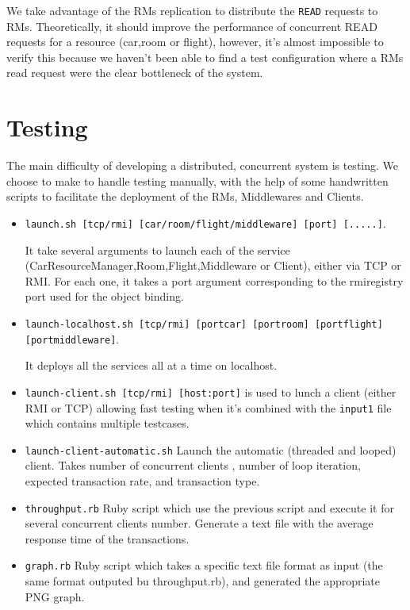 \documentclass[a4paper]{article}
\begin{document}
We take advantage of the RMs replication to distribute the \texttt{READ} requests to RMs. Theoretically, it should improve the performance of concurrent READ requests for a resource (car,room or flight), however, it's almost impossible to verify this because we haven't been able to find a test configuration where a RMs read request were the clear bottleneck of the system.


\section{Testing}

The main difficulty of developing a distributed, concurrent system is testing. We choose to make to handle testing manually, with the help of some handwritten scripts to facilitate the deployment of the RMs, Middlewares and Clients.

\begin{itemize}
\item
{\tt launch.sh [tcp/rmi] [car/room/flight/middleware] [port] [.....]}.

It take several arguments to launch each of the service (CarResourceManager,Room,Flight,Middleware or Client), either via TCP or RMI. For each one, it takes a port argument corresponding to the rmiregistry port used for the object binding.
\item
{\tt launch-localhost.sh [tcp/rmi] [portcar] [portroom] [portflight] [portmiddleware]}.

It deploys all the services all at a time on localhost.

\item
{\tt launch-client.sh [tcp/rmi] [host:port]} is used to lunch a client (either RMI or TCP)
allowing fast testing when it's combined with the {\tt input1} file which contains multiple testcases.

\item
{\tt launch-client-automatic.sh}
Launch the automatic (threaded and looped) client. Takes number of concurrent clients , number of loop iteration, expected transaction rate, and transaction type.

\item
{\tt throughput.rb}
Ruby script which use the previous script and execute it for several concurrent clients number. Generate a text file with the average response time of the transactions.

\item
{\tt graph.rb}
Ruby script which takes a specific text file format as input (the same format outputed bu throughput.rb), and generated the appropriate PNG graph.
\end{itemize}
\end{document}
